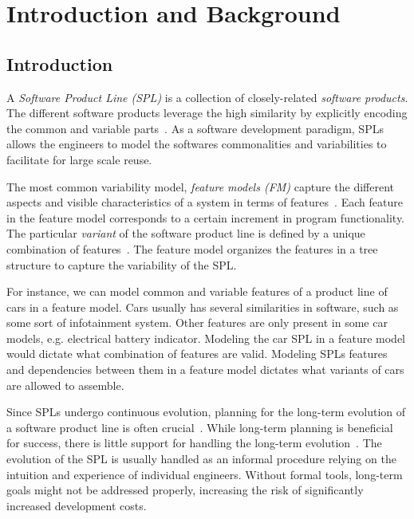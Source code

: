 \documentclass[a4paper,english]{ifimaster}
\begin{document}
\tableofcontents{}
\listoffigures{}
\listoftables{}

\mainmatter{}

\part{Introduction and Background}%
\label{prt:introduction_and_background}

\chapter{Introduction}%
\label{cha:introduction}

A \textit{Software Product Line (SPL)} is a collection of closely-related \textit{software products}. The different software products leverage the high similarity by explicitly encoding the common and variable parts~\cite{cite:spl_practices_and_patterns, cite:spl_book}. As a software development paradigm, SPLs allows the engineers to model the softwares commonalities and variabilities to facilitate for large scale reuse.

The most common variability model, \textit{feature models (FM)} capture the different aspects and visible characteristics of a system in terms of features~\cite{cite:software_diversity_ina}. Each feature in the feature model corresponds to a certain increment in program functionality. The particular \textit{variant} of the software product line is defined by a unique combination of features~\cite{cite:don_batory_fm_grammar_prop}. The feature model organizes the features in a tree structure to capture the variability of the SPL.

For instance, we can model common and variable features of a product line of cars in a feature model. Cars usually has several similarities in software, such as some sort of infotainment system. Other features are only present in some car models, e.g. electrical battery indicator. Modeling the car SPL in a feature model would dictate what combination of features are valid. Modeling SPLs features and dependencies between them in a feature model dictates what variants of cars are allowed to assemble.

Since SPLs undergo continuous evolution, planning for the long-term evolution of a software product line is often crucial~\cite{cite:product_line_evolution_reasoning}. While long-term planning is beneficial for success, there is little support for handling the long-term evolution~\cite{cite:evofm_fm_planning}. The evolution of the SPL is usually handled as an informal procedure relying on the intuition and experience of individual engineers. Without formal tools, long-term goals might not be addressed properly, increasing the risk of significantly increased development costs.
\end{document}
